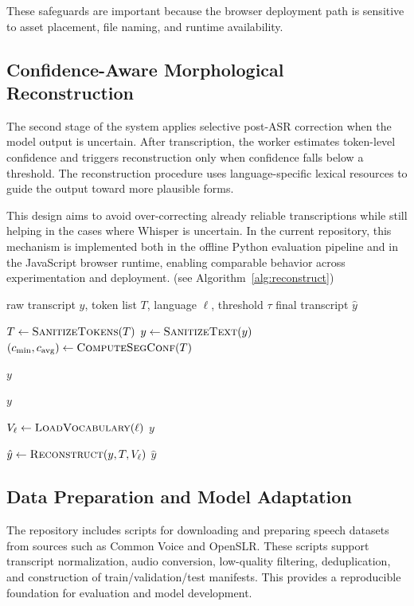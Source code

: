 \documentclass[11pt]{article}
\begin{document}
These safeguards are important because the browser deployment path is sensitive to asset placement, file naming, and runtime availability.

\subsection{Confidence-Aware Morphological Reconstruction}
The second stage of the system applies selective post-ASR correction when the model output is uncertain. After transcription, the worker estimates token-level confidence and triggers reconstruction only when confidence falls below a threshold. The reconstruction procedure uses language-specific lexical resources to guide the output toward more plausible forms.

This design aims to avoid over-correcting already reliable transcriptions while still helping in the cases where Whisper is uncertain. In the current repository, this mechanism is implemented both in the offline Python evaluation pipeline and in the JavaScript browser runtime, enabling comparable behavior across experimentation and deployment. (see Algorithm~\ref{alg:reconstruct})

\begin{algorithm}[t]
\caption{Confidence-aware post-ASR reconstruction}
\label{alg:reconstruct}
\begin{algorithmic}[1]
\Require raw transcript $y$, token list $T$, language $\ell$, threshold $\tau$
\Ensure final transcript $\hat{y}$

\State $T \gets \textsc{SanitizeTokens}(T)$
\State $y \gets \textsc{SanitizeText}(y)$
\State $(c_{\min}, c_{\text{avg}}) \gets\textsc{ComputeSegConf}(T)$

    \State \Return $y$
\EndIf

    \State \Return $y$
\EndIf

\State $V_\ell \gets \textsc{LoadVocabulary}(\ell)$
    \State \Return $y$
\EndIf

\State $\hat{y} \gets \textsc{Reconstruct}(y, T, V_\ell)$
\State \Return $\hat{y}$
\end{algorithmic}
\end{algorithm}

\subsection{Data Preparation and Model Adaptation}
The repository includes scripts for downloading and preparing speech datasets from sources such as Common Voice and OpenSLR. These scripts support transcript normalization, audio conversion, low-quality filtering, deduplication, and construction of train/validation/test manifests. This provides a reproducible foundation for evaluation and model development.
\end{document}
